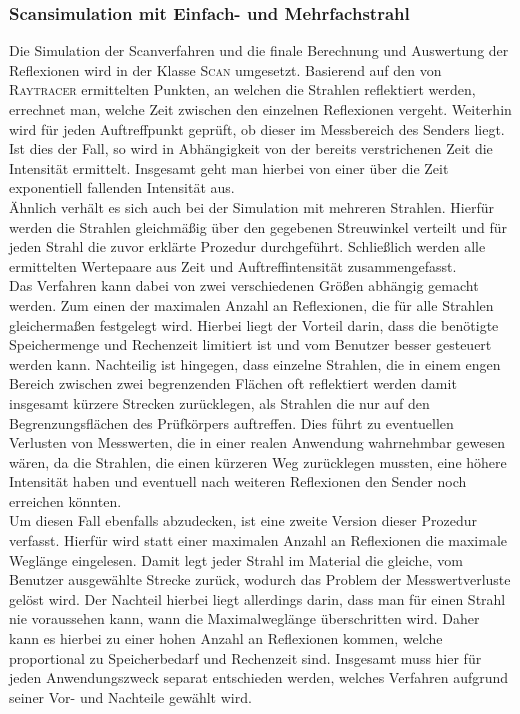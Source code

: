 \documentclass[reducespace,stylepage,semiarbeit]{spezidoc}
\begin{document}
\subsubsection{Scansimulation mit Einfach- und Mehrfachstrahl} %
Die Simulation der Scanverfahren und die finale Berechnung und Auswertung der Reflexionen wird in der Klasse \textsc{Scan} umgesetzt. %
Basierend auf den von \textsc{Raytracer} ermittelten Punkten, an welchen die Strahlen reflektiert werden, errechnet man, welche Zeit zwischen den einzelnen Reflexionen vergeht.
Weiterhin wird für jeden Auftreffpunkt geprüft, ob dieser im Messbereich des Senders liegt. 
Ist dies der Fall, so wird in Abhängigkeit von der bereits verstrichenen Zeit die Intensität ermittelt. 
Insgesamt geht man hierbei von einer über die Zeit exponentiell fallenden Intensität aus.\\
Ähnlich verhält es sich auch bei der Simulation mit mehreren Strahlen. 
Hierfür werden die Strahlen gleichmäßig über den gegebenen Streuwinkel verteilt und für jeden Strahl die zuvor erklärte Prozedur durchgeführt. 
Schließlich werden alle ermittelten Wertepaare aus Zeit und Auftreffintensität zusammengefasst.\\
Das Verfahren kann dabei von zwei verschiedenen Größen abhängig gemacht werden. 
Zum einen der maximalen Anzahl an Reflexionen, die für alle Strahlen gleichermaßen festgelegt wird. Hierbei liegt der Vorteil darin, dass die benötigte Speichermenge und Rechenzeit limitiert ist und vom Benutzer besser gesteuert werden kann. 
Nachteilig ist hingegen, dass einzelne Strahlen, die in einem engen Bereich zwischen zwei begrenzenden Flächen oft reflektiert werden damit insgesamt kürzere Strecken zurücklegen, als Strahlen die nur auf den Begrenzungsflächen des Prüfkörpers auftreffen. 
Dies führt zu eventuellen Verlusten von Messwerten, die in einer realen Anwendung wahrnehmbar gewesen wären, da die Strahlen, die einen kürzeren Weg zurücklegen mussten, eine höhere Intensität haben und eventuell nach weiteren Reflexionen den Sender noch erreichen könnten.\\
Um diesen Fall ebenfalls abzudecken, ist eine zweite Version dieser Prozedur verfasst. 
Hierfür wird statt einer maximalen Anzahl an Reflexionen die maximale Weglänge eingelesen. 
Damit legt jeder Strahl im Material die gleiche, vom Benutzer ausgewählte Strecke zurück, wodurch das Problem der Messwertverluste gelöst wird. 
Der Nachteil hierbei liegt allerdings darin, dass man für einen Strahl nie voraussehen kann, wann die Maximalweglänge überschritten wird. 
Daher kann es hierbei zu einer hohen Anzahl an Reflexionen kommen, welche proportional zu Speicherbedarf und Rechenzeit sind. 
Insgesamt muss hier für jeden Anwendungszweck separat entschieden werden, welches Verfahren aufgrund seiner Vor- und Nachteile gewählt wird.\\
\end{document}
